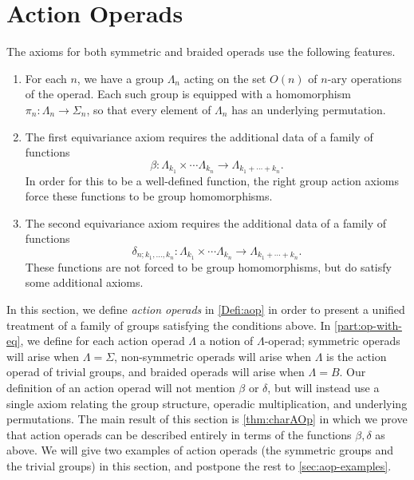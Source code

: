 \section{Action Operads}\label{sec:aop}

The axioms for both symmetric and braided operads use the following features.
\begin{enumerate}
\item For each $n$, we have a group $\Lambda_n$ acting on the set $O(n)$ of $n$-ary operations of the operad. Each such group is equipped with a homomorphism $\pi_n \colon \Lambda_n \to \Sigma_n$, so that every element of $\Lambda_n$ has an underlying permutation.
\item The first equivariance axiom requires the additional data of a family of functions
\[
\beta \colon \Lambda_{k_1} \times \cdots \Lambda_{k_n} \to \Lambda_{k_1 + \cdots + k_n}.
\]
In order for this to be a well-defined function, the right group action axioms force these functions to be group homomorphisms.
\item The second equivariance axiom requires the additional data of a family of functions
\[
\delta_{n; k_1, \ldots, k_n} \colon \Lambda_{k_1} \times \cdots \Lambda_{k_n} \to \Lambda_{k_1 + \cdots + k_n}.
\]
These functions are not forced to be group homomorphisms, but do satisfy some additional axioms.
\end{enumerate}
In this section, we define \emph{action operads} in \cref{Defi:aop} in order to present a unified treatment of a family of groups satisfying the conditions above. 
In \cref{part:op-with-eq}, we define for each action operad $\Lambda$ a notion of $\Lambda$-operad; symmetric operads will arise when $\Lambda = \Sigma$, non-symmetric operads will arise when $\Lambda$ is the action operad of trivial groups, and braided operads will arise when $\Lambda = B$.
Our definition of an action operad will not mention $\beta$ or $\delta$, but will instead use a single axiom relating the group structure, operadic multiplication, and underlying permutations. 
The main result of this section is \cref{thm:charAOp} in which we prove that action operads can be described entirely in terms of the functions $\beta, \delta$ as above.
We will give two examples of action operads (the symmetric groups and the trivial groups) in this section, and postpone the rest to \cref{sec:aop-examples}.


